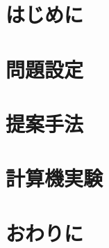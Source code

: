 \documentclass[a4paper,12pt]{jsbook}
\begin{document}
    \maketitle %
    \cleardoublepage %
    \tableofcontents %
    \thispagestyle{fancy2}
    \listoffigures %
    \thispagestyle{fancy2}
    \listoftables %
    \thispagestyle{fancy2}
    \cleardoublepage %


    \chapter{はじめに}
    \label{chap:introduction}
    

    \chapter{問題設定}
    \label{chap:setting}
    

    \chapter{提案手法}
    \label{chap:proposed}
    

    \chapter{計算機実験}
    \label{chap:experiment}
    

    \chapter{おわりに}
    \label{chap:conclusion}
    

    
    
\end{document}
